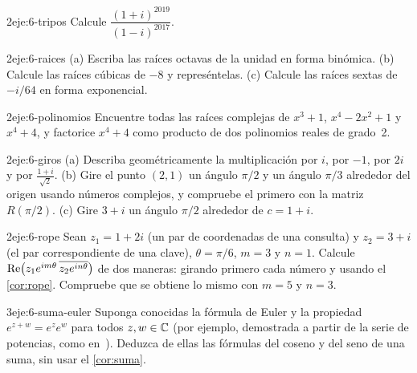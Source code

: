 \begin{ejercicio}{2}{eje:6-tripos}
Calcule $\dfrac{(1+i)^{2019}}{(1-i)^{2017}}$.
\end{ejercicio}

\begin{ejercicio}{2}{eje:6-raices}
(a) Escriba las raíces octavas de la unidad en forma binómica. (b) Calcule las raíces cúbicas de $-8$ y represéntelas. (c) Calcule las raíces sextas de $-i/64$ en forma exponencial.
\end{ejercicio}

\begin{ejercicio}{2}{eje:6-polinomios}
Encuentre todas las raíces complejas de $x^{3}+1$, $x^{4}-2x^{2}+1$ y $x^{4}+4$, y factorice $x^{4}+4$ como producto de dos polinomios reales de grado~2.
\end{ejercicio}

\begin{ejercicio}{2}{eje:6-giros}
(a) Describa geométricamente la multiplicación por $i$, por $-1$, por $2i$ y por $\frac{1+i}{\sqrt2}$. (b) Gire el punto $(2,1)$ un ángulo $\pi/2$ y un ángulo $\pi/3$ alrededor del origen usando números complejos, y compruebe el primero con la matriz $R(\pi/2)$. (c) Gire $3+i$ un ángulo $\pi/2$ alrededor de $c=1+i$.
\end{ejercicio}

\begin{ejercicio}{2}{eje:6-rope}
Sean $z_1=1+2i$ (un par de coordenadas de una consulta) y $z_2=3+i$ (el par correspondiente de una clave), $\theta=\pi/6$, $m=3$ y $n=1$. Calcule $\operatorname{Re}\bigl(z_1e^{im\theta}\,\overline{z_2e^{in\theta}}\bigr)$ de dos maneras: girando primero cada número y usando el \cref{cor:rope}. Compruebe que se obtiene lo mismo con $m=5$ y $n=3$.
\end{ejercicio}

\begin{ejercicio}{3}{eje:6-suma-euler}
Suponga conocidas la fórmula de Euler y la propiedad $e^{z+w}=e^{z}e^{w}$ para todos $z,w\in\mathbb{C}$ (por ejemplo, demostrada a partir de la serie de potencias, como en~\cite[§1.2]{cambvm}). Deduzca de ellas las fórmulas del coseno y del seno de una suma, sin usar el \cref{cor:suma}.
\end{ejercicio}

